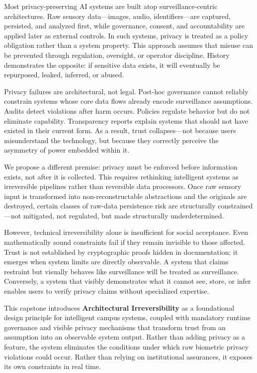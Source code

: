 \documentclass[conference]{IEEEtran}
\begin{document}
Most privacy-preserving AI systems are built atop surveillance-centric architectures. Raw sensory data---images, audio, identifiers---are captured, persisted, and analyzed first, while governance, consent, and accountability are applied later as external controls. In such systems, privacy is treated as a policy obligation rather than a system property. This approach assumes that misuse can be prevented through regulation, oversight, or operator discipline. History demonstrates the opposite: if sensitive data exists, it will eventually be repurposed, leaked, inferred, or abused.

Privacy failures are architectural, not legal. Post-hoc governance cannot reliably constrain systems whose core data flows already encode surveillance assumptions. Audits detect violations after harm occurs. Policies regulate behavior but do not eliminate capability. Transparency reports explain systems that should not have existed in their current form. As a result, trust collapses---not because users misunderstand the technology, but because they correctly perceive the asymmetry of power embedded within it.

We propose a different premise: privacy must be enforced before information exists, not after it is collected. This requires rethinking intelligent systems as irreversible pipelines rather than reversible data processors. Once raw sensory input is transformed into non-reconstructable abstractions and the originals are destroyed, certain classes of raw-data persistence risk are structurally constrained---not mitigated, not regulated, but made structurally underdetermined.

However, technical irreversibility alone is insufficient for social acceptance. Even mathematically sound constraints fail if they remain invisible to those affected. Trust is not established by cryptographic proofs hidden in documentation; it emerges when system limits are directly observable. A system that claims restraint but visually behaves like surveillance will be treated as surveillance. Conversely, a system that visibly demonstrates what it cannot see, store, or infer enables users to verify privacy claims without specialized expertise.

This capstone introduces \textbf{Architectural Irreversibility} as a foundational design principle for intelligent campus systems, coupled with mandatory runtime governance and visible privacy mechanisms that transform trust from an assumption into an observable system output. Rather than adding privacy as a feature, the system eliminates the conditions under which raw biometric privacy violations could occur. Rather than relying on institutional assurances, it exposes its own constraints in real time.
\end{document}
